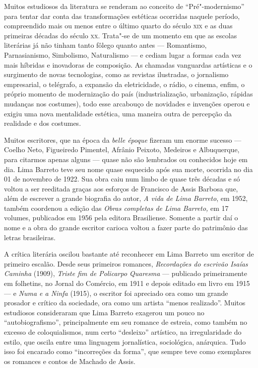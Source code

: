 \documentclass{extarticle}
\begin{document}
Muitos estudiosos da literatura se renderam ao conceito de
``Pré"-modernismo'' para tentar dar conta das transformações estéticas
ocorridas naquele período, compreendido mais ou menos entre o último
quarto do século \textsc{xix} e as duas primeiras décadas do século \textsc{xx}. Trata"-se
de um momento em que as escolas literárias já não tinham tanto fôlego
quanto antes --- Romantismo, Parnasianismo, Simbolismo, Naturalismo --- e
cediam lugar a formas cada vez mais híbridas e inovadoras de composição.
As chamadas vanguardas artísticas e o surgimento de novas tecnologias,
como as revistas ilustradas, o jornalismo empresarial, o telégrafo, a
expansão da eletricidade, o rádio, o cinema, enfim, o próprio momento de
modernização do país (industrialização, urbanização, rápidas mudanças
nos costumes), todo esse arcabouço de novidades e invenções operou e
exigiu uma nova mentalidade estética, uma maneira outra de percepção da
realidade e dos costumes.

Muitos escritores, que na época da \emph{belle époque} fizeram um enorme
sucesso --- Coelho Neto, Figueiredo Pimentel, Afrânio Peixoto, Medeiros e
Albuquerque, para citarmos apenas alguns --- quase não são lembrados ou
conhecidos hoje em dia. Lima Barreto teve seu nome quase esquecido após
sua morte, ocorrida no dia 01 de novembro de 1922. Sua obra caiu num
limbo de quase três décadas e só voltou a ser reeditada graças aos
esforços de Francisco de Assis Barbosa que, além de escrever a grande
biografia do autor, \emph{A vida de Lima Barreto}, em 1952, também
coordenou a edição das \emph{Obras completas de Lima Barreto,} em 17
volumes, publicados em 1956 pela editora Brasiliense. Somente a partir
daí o nome e a obra do grande escritor carioca voltou a fazer parte do
patrimônio das letras brasileiras.

A crítica literária oscilou bastante até reconhecer em Lima Barreto um
escritor de primeiro escalão. Desde seus primeiros romances,
\emph{Recordações do escrivão Isaías Caminha} (1909), \emph{Triste fim
de Policarpo Quaresma} --- publicado primeiramente em folhetins, no
Jornal do Comércio, em 1911 e depois editado em livro em 1915 --- e
\emph{Numa e a Ninfa} (1915), o escritor foi apreciado ora como um
grande prosador e crítico da sociedade, ora como um artista ``menos
realizado''. Muitos estudiosos consideraram que Lima Barreto exagerou um
pouco no ``autobiografismo'', principalmente em seu romance de estreia,
como também no excesso de coloquialismos, num certo ``desleixo''
artístico, na irregularidade do estilo, que oscila entre uma linguagem
jornalística, sociológica, anárquica. Tudo isso foi encarado como
``incorreções da forma'', que sempre teve como exemplares os romances e
contos de Machado de Assis.
\end{document}
